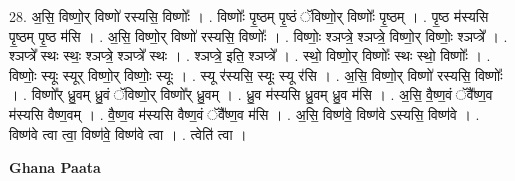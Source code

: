 \documentclass[17pt]{extarticle}
\begin{document}
28. अ॒सि॒ विष्णो॒र् विष्णो॑ रस्यसि॒ विष्णोः᳚ । . विष्णोः᳚ पृ॒ष्ठम् पृ॒ष्ठं ॅविष्णो॒र् विष्णोः᳚ पृ॒ष्ठम् । . पृ॒ष्ठ म॑स्यसि पृ॒ष्ठम् पृ॒ष्ठ म॑सि । . अ॒सि॒ विष्णो॒र् विष्णो॑ रस्यसि॒ विष्णोः᳚ । . विष्णोः॒ श्ञप्त्रे॒ श्ञप्त्रे॒ विष्णो॒र् विष्णोः॒ श्ञप्त्रे᳚ । . श्ञप्त्रे᳚ स्थः स्थः॒ श्ञप्त्रे॒ श्ञप्त्रे᳚ स्थः । . श्ञप्त्रे॒ इति॒ श्ञप्त्रे᳚ । . स्थो॒ विष्णो॒र् विष्णोः᳚ स्थः स्थो॒ विष्णोः᳚ । . विष्णोः॒ स्यूः स्यूर् विष्णो॒र् विष्णोः॒ स्यूः । . स्यू र॑स्यसि॒ स्यूः स्यू र॑सि । . अ॒सि॒ विष्णो॒र् विष्णो॑ रस्यसि॒ विष्णोः᳚ । . विष्णो᳚र् ध्रु॒वम् ध्रु॒वं ॅविष्णो॒र् विष्णो᳚र् ध्रु॒वम् । . ध्रु॒व म॑स्यसि ध्रु॒वम् ध्रु॒व म॑सि । . अ॒सि॒ वै॒ष्ण॒वं ॅवै᳚ष्ण॒व म॑स्यसि वैष्ण॒वम् । . वै॒ष्ण॒व म॑स्यसि वैष्ण॒वं ॅवै᳚ष्ण॒व म॑सि । . अ॒सि॒ विष्ण॑वे॒ विष्ण॑वे ऽस्यसि॒ विष्ण॑वे । . विष्ण॑वे त्वा त्वा॒ विष्ण॑वे॒ विष्ण॑वे त्वा । . त्वेति॑ त्वा । \newline

\textbf{Ghana Paata } \newline
\end{document}
